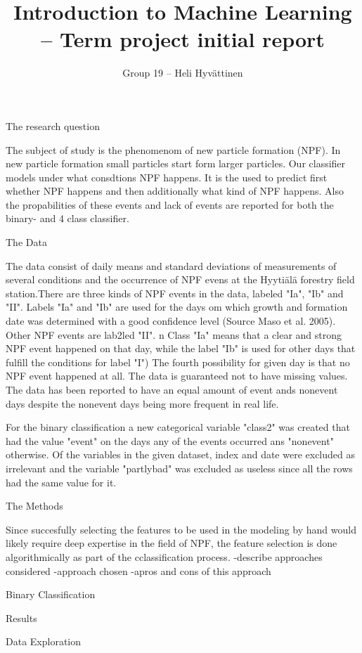 \documentclass[a4size, 12pt]{report}
\begin{document}
	
	\author{Group 19 – Heli Hyvättinen}
	\title{Introduction to Machine Learning – Term project initial report }
	
	The research question
	
	The subject of study is the phenomenom of new particle formation (NPF). In new particle formation small particles start form larger particles. Our classifier models under what consdtions NPF happens. It is the used to predict first whether NPF happens and then additionally what kind of NPF happens. Also the propabilities of these events and lack of events are reported for both the binary- and 4 class classifier.  
	     
	
	The Data
	
	The data consist of daily means and standard deviations of measurements of several conditions and the occurrence of NPF evens at the Hyytiälä forestry field station.There are three kinds of NPF events in the data, labeled "Ia", "Ib" and "II". Labels "Ia" and "Ib" are used for the days om which growth and formation date was determined with a good confidence level (Source Maso et al. 2005). Other NPF events are lab2led "II".
	n  Class "Ia" means that a clear and strong NPF event happened on that day, while the label "Ib" is used for other days that fulfill the conditions for label "I")  The fourth possibility for given day is that no NPF event happened at all. The data is guaranteed not to have missing values. The data has been reported to have an equal amount of event ands nonevent days despite the nonevent days being more frequent in real life.
	
	For the binary classification a new categorical variable "class2" was created that had the value "event" on the days any of the events occurred ans "nonevent" otherwise. Of the variables in the given dataset, index and date were excluded as irrelevant and the variable "partlybad" was excluded as useless since all the rows had the same value for it.  
	
	The Methods
		
	Since succesfully selecting the features to be used in the modeling by hand would likely  require deep expertise in the field of NPF, the feature selection is done algorithmically as part of the cclassification process. 	
	-describe approaches considered
	-approach chosen
	-apros and cons of this approach
	
	Binary Classification
	
		Results
	
	Data Exploration
	
\end{document}
